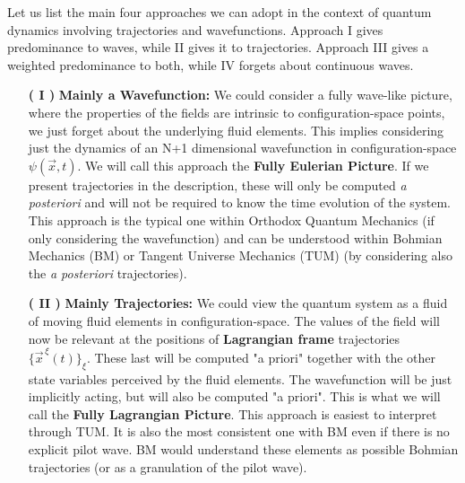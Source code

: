 \documentclass[11pt, a4paper]{article} %
\begin{document}
Let us list the main four approaches we can adopt in the context of quantum dynamics involving trajectories and wavefunctions. Approach I gives predominance to waves, while II gives it to trajectories. Approach III gives a weighted predominance to both, while IV forgets about continuous waves.
\vspace{-0.2cm}
\begin{enumerate}
\item[\bf ( I )] {\bf Mainly a Wavefunction: } We could consider a fully wave-like picture, where the properties of the fields are intrinsic to configuration-space points, we just forget about the underlying fluid elements. This implies considering just the dynamics of an N+1 dimensional wavefunction in configuration-space $\psi(\vec{x},t)$. We will call this approach the {\bf Fully Eulerian Picture}. If we present trajectories in the description, these will only be computed {\em a posteriori} and will not be required to know the time evolution of the system. This approach is the typical one within Orthodox Quantum Mechanics (if only considering the wavefunction) and can be understood within Bohmian Mechanics (BM) or Tangent Universe Mechanics (TUM) (by considering also the {\em a posteriori} trajectories).


\item[\bf ( II )]{\bf Mainly Trajectories:} We could view the quantum system as a fluid of moving fluid elements in configuration-space. The values of the field will now be relevant at the positions of {\bf Lagrangian frame} trajectories $\{\vec{x}^{\, \xi}(t)\}_\xi$. These last will be computed "a priori" together with the other state variables perceived by the fluid elements. The wavefunction will be just implicitly acting, but will also be computed "a priori". This is what we will call the {\bf Fully Lagrangian Picture}. This approach is easiest to interpret through TUM. It is also the most consistent one with BM even if there is no explicit pilot wave. BM would understand these elements as possible Bohmian trajectories (or as a granulation of the pilot wave).


\end{enumerate}
\end{document}
